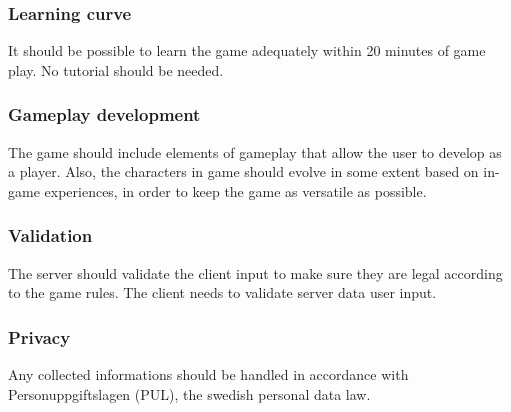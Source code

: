 

\subsubsection{Learning curve}
It should be possible to learn the game adequately within 20 minutes of game play. No tutorial should be needed.


\subsubsection{Gameplay development}
The game should include elements of gameplay that allow the user to develop as a player. Also, the characters in game should evolve in some extent based on in-game experiences, in order to keep the game as versatile as possible.



\subsubsection{Validation}
\label{cheating}
The server should validate the client input to make sure they are legal according to the game rules. The client needs to validate server data user input. 


\subsubsection{Privacy}
Any collected informations should be handled in accordance with Personuppgiftslagen (PUL), the swedish personal data law.



